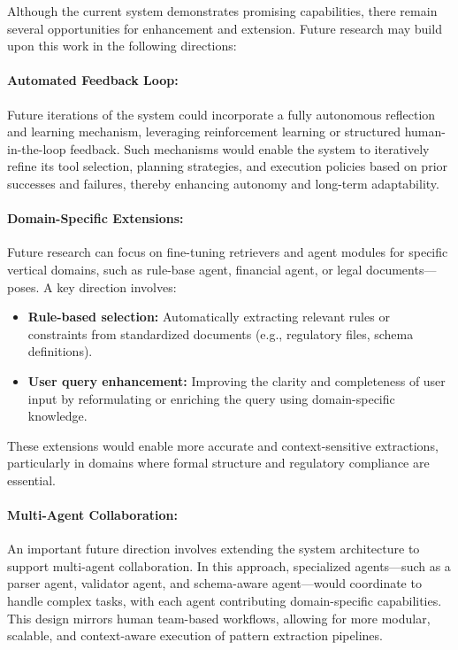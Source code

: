 Although the current system demonstrates promising capabilities, there remain several opportunities for enhancement and extension. Future research may build upon this work in the following directions:

\paragraph{Automated Feedback Loop:}
Future iterations of the system could incorporate a fully autonomous reflection and learning mechanism, leveraging reinforcement learning or structured human-in-the-loop feedback. Such mechanisms would enable the system to iteratively refine its tool selection, planning strategies, and execution policies based on prior successes and failures, thereby enhancing autonomy and long-term adaptability.


\paragraph{Domain-Specific Extensions:}
Future research can focus on fine-tuning retrievers and agent modules for specific vertical domains, such as rule-base agent, financial agent, or legal documents—poses. A key direction involves:

\begin{itemize}
    \item \textbf{Rule-based selection:} Automatically extracting relevant rules or constraints from standardized documents (e.g., regulatory files, schema definitions).
    \item \textbf{User query enhancement:} Improving the clarity and completeness of user input by reformulating or enriching the query using domain-specific knowledge.
\end{itemize}

These extensions would enable more accurate and context-sensitive extractions, particularly in domains where formal structure and regulatory compliance are essential.



\paragraph{Multi-Agent Collaboration:}
An important future direction involves extending the system architecture to support multi-agent collaboration. In this approach, specialized agents—such as a parser agent, validator agent, and schema-aware agent—would coordinate to handle complex tasks, with each agent contributing domain-specific capabilities. This design mirrors human team-based workflows, allowing for more modular, scalable, and context-aware execution of pattern extraction pipelines.



